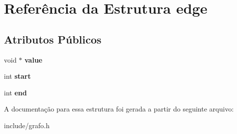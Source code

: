 \hypertarget{structedge}{}\section{Referência da Estrutura edge}
\label{structedge}
\subsection*{Atributos Públicos}
\begin{DoxyCompactItemize}
\item 
\mbox{\label{structedge_a91c3b14d69d426b3ded39e9ca8d26db7}} 
void $\ast$ {\bfseries value}
\item 
\mbox{\label{structedge_a932f908ef7a7ba5b5221c321cb811f85}} 
int {\bfseries start}
\item 
\mbox{\label{structedge_ac5d4c26a39e285e8de29e2b8e9874d29}} 
int {\bfseries end}
\end{DoxyCompactItemize}


A documentação para essa estrutura foi gerada a partir do seguinte arquivo\+:\begin{DoxyCompactItemize}
\item 
include/grafo.\+h\end{DoxyCompactItemize}
